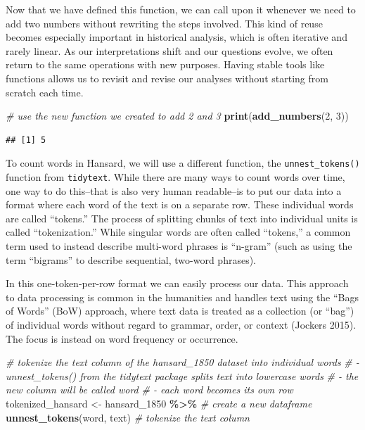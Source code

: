 \documentclass[
]{article}
\newenvironment{Shaded}{\begin{snugshade}}{\end{snugshade}}
\newcommand{\CommentTok}[1]{\textcolor[rgb]{0.56,0.35,0.01}{\textit{#1}}}
\newcommand{\DecValTok}[1]{\textcolor[rgb]{0.00,0.00,0.81}{#1}}
\newcommand{\FunctionTok}[1]{\textcolor[rgb]{0.13,0.29,0.53}{\textbf{#1}}}
\newcommand{\NormalTok}[1]{#1}
\newcommand{\OtherTok}[1]{\textcolor[rgb]{0.56,0.35,0.01}{#1}}
\newcommand{\SpecialCharTok}[1]{\textcolor[rgb]{0.81,0.36,0.00}{\textbf{#1}}}
\begin{document}
Now that we have defined this function, we can call upon it whenever we
need to add two numbers without rewriting the steps involved. This kind
of reuse becomes especially important in historical analysis, which is
often iterative and rarely linear. As our interpretations shift and our
questions evolve, we often return to the same operations with new
purposes. Having stable tools like functions allows us to revisit and
revise our analyses without starting from scratch each time.

\begin{Shaded}
\begin{Highlighting}[]
\CommentTok{\# use the new function we created to add 2 and 3}
\FunctionTok{print}\NormalTok{(}\FunctionTok{add\_numbers}\NormalTok{(}\DecValTok{2}\NormalTok{, }\DecValTok{3}\NormalTok{))}
\end{Highlighting}
\end{Shaded}

\begin{verbatim}
## [1] 5
\end{verbatim}

To count words in Hansard, we will use a different function, the
\texttt{unnest\_tokens()} function from \texttt{tidytext}. While there
are many ways to count words over time, one way to do this--that is also
very human readable--is to put our data into a format where each word of
the text is on a separate row. These individual words are called
``tokens.'' The process of splitting chunks of text into individual
units is called ``tokenization.'' While singular words are often called
``tokens,'' a common term used to instead describe multi-word phrases is
``n-gram'' (such as using the term ``bigrams'' to describe sequential,
two-word phrases).

In this one-token-per-row format we can easily process our data. This
approach to data processing is common in the humanities and handles text
using the ``Bags of Words'' (BoW) approach, where text data is treated
as a collection (or ``bag'') of individual words without regard to
grammar, order, or context (Jockers 2015). The focus is instead on word
frequency or occurrence.

\begin{Shaded}
\begin{Highlighting}[]
\CommentTok{\# tokenize the \textquotesingle{}text\textquotesingle{} column of the hansard\_1850 dataset into individual words}
\CommentTok{\# {-} \textquotesingle{}unnest\_tokens()\textquotesingle{} from the \textquotesingle{}tidytext\textquotesingle{} package splits text into lowercase words}
\CommentTok{\# {-} the new column will be called \textquotesingle{}word\textquotesingle{}}
\CommentTok{\# {-} each word becomes its own row }
\NormalTok{tokenized\_hansard }\OtherTok{\textless{}{-}}\NormalTok{ hansard\_1850 }\SpecialCharTok{\%\textgreater{}\%} \CommentTok{\# create a new dataframe}
  \FunctionTok{unnest\_tokens}\NormalTok{(word, text) }\CommentTok{\# tokenize the \textquotesingle{}text\textquotesingle{} column }
\end{Highlighting}
\end{Shaded}
\end{document}
